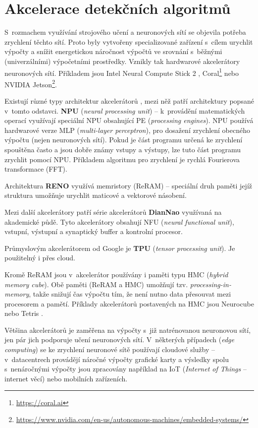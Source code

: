 \section{Akcelerace detekčních algoritmů}
\label{sekce:akcelerace}

S~rozmachem využívání strojového učení a neuronových sítí se objevila potřeba zrychlení těchto sítí. Proto byly vytvořeny specializované zařízení s~cílem urychlit výpočty a snížit energetickou náročnost výpočtů ve srovnání s~běžnými (univerzálními) výpočetními prostředky. Vznikly tak hardwarové akcelerátory neuronových sítí. Příkladem jsou Intel Neural Compute Stick 2 \cite{ncs2}, Coral\footnote{\url{https://coral.ai}} nebo NVIDIA Jetson\footnote{\url{https://www.nvidia.com/en-us/autonomous-machines/embedded-systems/}}.

Existují různé typy architektur akcelerátorů \cite{acceleratorsSurvey}, mezi něž patří architektury popsané v~tomto odstavci.
\textbf{NPU} (\emph{neural processing unit}) -- k~provádění matematických operací využívají speciální NPU obsahující PE (\emph{processing engines}). NPU používá hardwarové verze MLP (\emph{multi-layer perceptron}), pro dosažení zrychlení obecného výpočtu (nejen neuronových sítí). Pokud je část programu určená ke zrychlení spouštěna často a jsou dobře známy vstupy a výstupy, lze tuto část programu zrychlit pomocí NPU. Příkladem algoritmu pro zrychlení je rychlá Fourierova transformace (FFT).

Architektura \textbf{RENO} využívá memristory (ReRAM) -- speciální druh paměti jejíž struktura umožňuje urychlit maticové a vektorové násobení.

Mezi další akcelerátory patří série akcelerátorů \textbf{DianNao} využívaná na akademické půdě. Tyto akcelerátory obsahují NFU (\emph{neural functional unit}), vstupní, výstupní a synaptický buffer a kontrolní procesor.

Průmyslovým akcelerátorem od Google je \textbf{TPU} (\emph{tensor processing unit}). Je použitelný i přes cloud.

Kromě ReRAM jsou v~akcelerátor používány i paměti typu HMC (\emph{hybrid memory cube}). Obě paměti (ReRAM a HMC) umožňují tzv. \emph{processing-in-memory}, takže snižují čas výpočtu tím, že není nutno data přesouvat mezi procesorem a pamětí. Příklady akcelerátorů postavených na HMC jsou Neurocube \cite{neurocube} nebo Tetris \cite{tetris}.

Většina akcelerátorů je zaměřena na výpočty s~již natrénovanou neuronovou sítí, jen pár jich podporuje učení neuronových sítí. V~některých případech (\emph{edge computing}) se ke zrychlení neuronové sítě používají cloudové služby -- v~datacentrech provádějí náročné výpočty grafické karty a výsledky spolu s~nenáročnými výpočty jsou zpracovány například na IoT (\emph{Internet of Things} -- internet věcí) nebo mobilních zařízeních.

